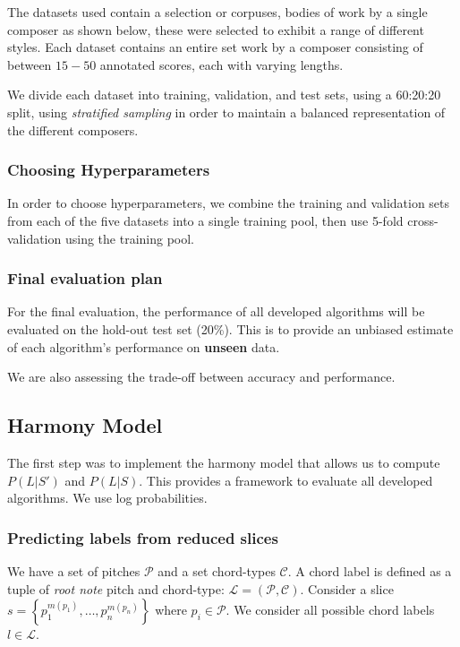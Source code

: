 \documentclass[12pt,a4paper,twoside,openright]{report}
\theoremstyle{definition}
\begin{document}
The datasets used contain a selection or corpuses, bodies of work by a single composer as shown below, these were selected to exhibit a range of different styles. 
Each dataset contains an entire set work by a composer consisting of between $15-50$ annotated scores, each with varying lengths.

We divide each dataset into training, validation, and test sets, using a 60:20:20 split, using \textit{stratified sampling} in order to maintain a balanced representation of the different composers.

\subsubsection{Choosing Hyperparameters}

In order to choose hyperparameters, we combine the training and validation sets from each of the five datasets into a single training pool, then use 5-fold cross-validation using the training pool. 

\subsubsection{Final evaluation plan}

For the final evaluation, the performance of all developed algorithms will be evaluated on the hold-out test set (20\%). This is to provide an unbiased estimate of each algorithm's performance on \textbf{unseen} data.

We are also assessing the trade-off between accuracy and performance.

\subsection{Harmony Model}

The first step was to implement the harmony model that allows us to compute $P(L|S')$ and $P(L|S)$. This provides a framework to evaluate all developed algorithms. We use log probabilities.


\subsubsection{Predicting labels from reduced slices}
We have a set of pitches $\mathcal{P}$ and a set chord-types $\mathcal{C}$.
A chord label is defined as a tuple of \textit{root note} pitch and chord-type: $\mathcal{L} = (\mathcal{P}, \mathcal{C})$. 
Consider a slice $s = \left\{ p_1^{m(p_1)} , \dots, p_n^{m(p_n)} \right\}$ where $p_i \in \mathcal{P}$. We consider all possible chord labels $l \in \mathcal{L}$.
\end{document}
